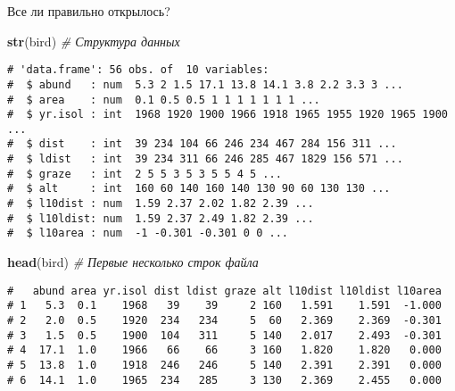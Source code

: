 \documentclass[
  ignorenonframetext,
  t,xcolor=table]{beamer}
\newenvironment{Shaded}{\begin{snugshade}}{\end{snugshade}}
\newcommand{\CommentTok}[1]{\textcolor[rgb]{0.56,0.35,0.01}{\textit{#1}}}
\newcommand{\FunctionTok}[1]{\textcolor[rgb]{0.13,0.29,0.53}{\textbf{#1}}}
\newcommand{\NormalTok}[1]{#1}
\begin{document}
\begin{frame}[fragile]{Все ли правильно открылось?}
\protect\hypertarget{ux432ux441ux435-ux43bux438-ux43fux440ux430ux432ux438ux43bux44cux43dux43e-ux43eux442ux43aux440ux44bux43bux43eux441ux44c}{}
\begin{Shaded}
\begin{Highlighting}[]
\FunctionTok{str}\NormalTok{(bird)      }\CommentTok{\# Структура данных}
\end{Highlighting}
\end{Shaded}

\begin{verbatim}
# 'data.frame': 56 obs. of  10 variables:
#  $ abund   : num  5.3 2 1.5 17.1 13.8 14.1 3.8 2.2 3.3 3 ...
#  $ area    : num  0.1 0.5 0.5 1 1 1 1 1 1 1 ...
#  $ yr.isol : int  1968 1920 1900 1966 1918 1965 1955 1920 1965 1900 ...
#  $ dist    : int  39 234 104 66 246 234 467 284 156 311 ...
#  $ ldist   : int  39 234 311 66 246 285 467 1829 156 571 ...
#  $ graze   : int  2 5 5 3 5 3 5 5 4 5 ...
#  $ alt     : int  160 60 140 160 140 130 90 60 130 130 ...
#  $ l10dist : num  1.59 2.37 2.02 1.82 2.39 ...
#  $ l10ldist: num  1.59 2.37 2.49 1.82 2.39 ...
#  $ l10area : num  -1 -0.301 -0.301 0 0 ...
\end{verbatim}

\begin{Shaded}
\begin{Highlighting}[]
\FunctionTok{head}\NormalTok{(bird)     }\CommentTok{\# Первые несколько строк файла}
\end{Highlighting}
\end{Shaded}

\begin{verbatim}
#   abund area yr.isol dist ldist graze alt l10dist l10ldist l10area
# 1   5.3  0.1    1968   39    39     2 160   1.591    1.591  -1.000
# 2   2.0  0.5    1920  234   234     5  60   2.369    2.369  -0.301
# 3   1.5  0.5    1900  104   311     5 140   2.017    2.493  -0.301
# 4  17.1  1.0    1966   66    66     3 160   1.820    1.820   0.000
# 5  13.8  1.0    1918  246   246     5 140   2.391    2.391   0.000
# 6  14.1  1.0    1965  234   285     3 130   2.369    2.455   0.000
\end{verbatim}
\end{frame}
\end{document}
